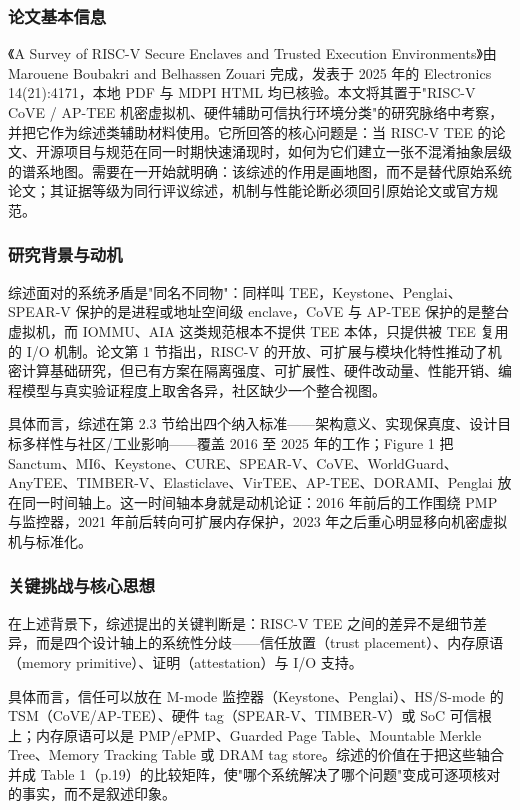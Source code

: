 \documentclass[11pt]{ctexart}
\begin{document}
\subsubsection{论文基本信息}
《A Survey of RISC-V Secure Enclaves and Trusted Execution Environments》由 Marouene Boubakri and Belhassen Zouari 完成，发表于 2025 年的 Electronics 14(21):4171，本地 PDF 与 MDPI HTML 均已核验。本文将其置于"RISC-V CoVE / AP-TEE 机密虚拟机、硬件辅助可信执行环境分类"的研究脉络中考察，并把它作为综述类辅助材料使用。它所回答的核心问题是：当 RISC-V TEE 的论文、开源项目与规范在同一时期快速涌现时，如何为它们建立一张不混淆抽象层级的谱系地图。需要在一开始就明确：该综述的作用是画地图，而不是替代原始系统论文；其证据等级为同行评议综述，机制与性能论断必须回引原始论文或官方规范。\cite{boubakri2025riscvtee}\par
\subsubsection{研究背景与动机}
综述面对的系统矛盾是"同名不同物"：同样叫 TEE，Keystone、Penglai、SPEAR-V 保护的是进程或地址空间级 enclave，CoVE 与 AP-TEE 保护的是整台虚拟机，而 IOMMU、AIA 这类规范根本不提供 TEE 本体，只提供被 TEE 复用的 I/O 机制。论文第 1 节指出，RISC-V 的开放、可扩展与模块化特性推动了机密计算基础研究，但已有方案在隔离强度、可扩展性、硬件改动量、性能开销、编程模型与真实验证程度上取舍各异，社区缺少一个整合视图。\par
具体而言，综述在第 2.3 节给出四个纳入标准——架构意义、实现保真度、设计目标多样性与社区/工业影响——覆盖 2016 至 2025 年的工作；Figure 1 把 Sanctum、MI6、Keystone、CURE、SPEAR-V、CoVE、WorldGuard、AnyTEE、TIMBER-V、Elasticlave、VirTEE、AP-TEE、DORAMI、Penglai 放在同一时间轴上。这一时间轴本身就是动机论证：2016 年前后的工作围绕 PMP 与监控器，2021 年前后转向可扩展内存保护，2023 年之后重心明显移向机密虚拟机与标准化。\par
\subsubsection{关键挑战与核心思想}
在上述背景下，综述提出的关键判断是：RISC-V TEE 之间的差异不是细节差异，而是四个设计轴上的系统性分歧——信任放置（trust placement）、内存原语（memory primitive）、证明（attestation）与 I/O 支持。\par
具体而言，信任可以放在 M-mode 监控器（Keystone、Penglai）、HS/S-mode 的 TSM（CoVE/AP-TEE）、硬件 tag（SPEAR-V、TIMBER-V）或 SoC 可信根上；内存原语可以是 PMP/ePMP、Guarded Page Table、Mountable Merkle Tree、Memory Tracking Table 或 DRAM tag store。综述的价值在于把这些轴合并成 Table 1（p.19）的比较矩阵，使"哪个系统解决了哪个问题"变成可逐项核对的事实，而不是叙述印象。\par
\end{document}
